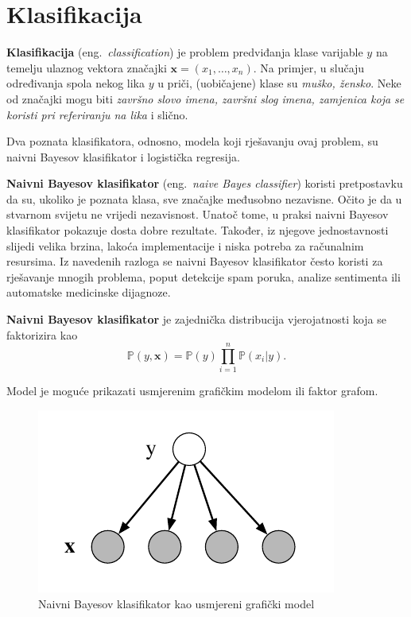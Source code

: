 \documentclass[a4paper,twoside,12pt]{memoir} %
\newcommand{\ti}[1]{\textit{#1\/}}
\newcommand{\tb}{\textbf}
\begin{document}
	\section{Klasifikacija}

	\tb{Klasifikacija} (eng.~\ti{classification}) je problem predviđanja klase varijable $y$ na temelju ulaznog vektora značajki $\mathbf{x} = (x_1, \ldots, x_n)$. Na primjer, u slučaju određivanja spola nekog lika $y$ u priči, (uobičajene) klase su \ti{muško, žensko}. Neke od značajki mogu biti \ti{završno slovo imena, završni slog imena, zamjenica koja se koristi pri referiranju na lika} i slično.

	Dva poznata klasifikatora, odnosno, modela koji rješavanju ovaj problem, su naivni Bayesov klasifikator i logistička regresija.

	\bigskip

	\tb{Naivni Bayesov klasifikator} (eng.~\ti{naive Bayes classifier}) koristi pretpostavku da su, ukoliko je poznata klasa, sve značajke međusobno nezavisne. Očito je da u stvarnom svijetu ne vrijedi nezavisnost. Unatoč tome, u praksi naivni Bayesov klasifikator pokazuje dosta dobre rezultate. Također, iz njegove jednostavnosti slijedi velika brzina, lakoća implementacije i niska potreba za računalnim resursima. Iz navedenih razloga se naivni Bayesov klasifikator često koristi za rješavanje mnogih problema, poput detekcije spam poruka, analize sentimenta ili automatske medicinske dijagnoze.

	\begin{defn}
		\tb{Naivni Bayesov klasifikator} je zajednička distribucija vjerojatnosti koja se faktorizira kao
		\begin{equation} \label{naive_bayes}
		\mathbb{P}(y, \mathbf{x}) = \mathbb{P}(y) \prod_{i=1}^{n}\mathbb{P}(x_i|y).
		\end{equation}
	\end{defn}

	Model je moguće prikazati usmjerenim grafičkim modelom ili faktor grafom.

	\begin{figure}[H]
		\centering
		\includegraphics[scale = 0.5]{bayes_directed.png}
		\caption{Naivni Bayesov klasifikator kao usmjereni grafički model}
	\end{figure}
\end{document}
